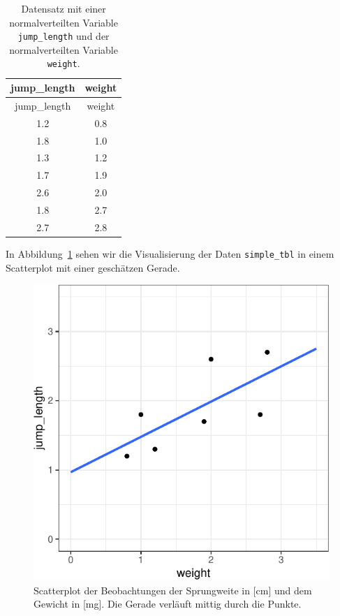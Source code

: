 \documentclass[
  letterpaper,
]{scrbook}
\begin{document}
\hypertarget{tbl-model-0}{}
\begin{longtable}[]{@{}cc@{}}
\caption{\label{tbl-model-0}Datensatz mit einer normalverteilten
Variable \texttt{jump\_length} und der normalverteilten Variable
\texttt{weight}.}\tabularnewline
\toprule()
jump\_length & weight \\
\midrule()
\endfirsthead
\toprule()
jump\_length & weight \\
\midrule()
\endhead
1.2 & 0.8 \\
1.8 & 1.0 \\
1.3 & 1.2 \\
1.7 & 1.9 \\
2.6 & 2.0 \\
1.8 & 2.7 \\
2.7 & 2.8 \\
\bottomrule()
\end{longtable}

In Abbildung~\ref{fig-scatter-lin-01} sehen wir die Visualisierung der
Daten \texttt{simple\_tbl} in einem Scatterplot mit einer geschätzen
Gerade.

\begin{figure}

{\centering \includegraphics{./stat-linear-reg-basic_files/figure-pdf/fig-scatter-lin-01-1.pdf}

}

\caption{\label{fig-scatter-lin-01}Scatterplot der Beobachtungen der
Sprungweite in {[}cm{]} und dem Gewicht in {[}mg{]}. Die Gerade verläuft
mittig durch die Punkte.}

\end{figure}
\end{document}
